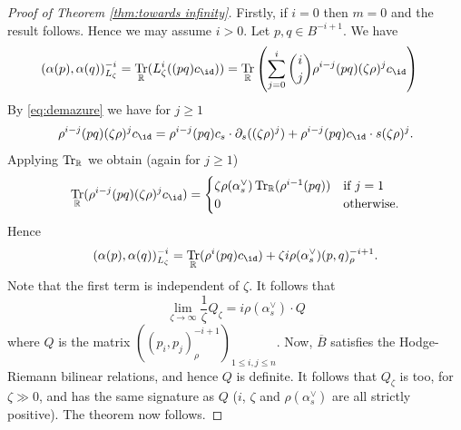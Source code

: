 \documentclass[11pt]{amsart}
\numberwithin{equation}{section}
\def\a{\alpha}
\def\z{\zeta}
\DeclareMathOperator{\Tr}{Tr}
\def\ov{\overline}
\def\to{\rightarrow}
\theoremstyle{definition}
\theoremstyle{remark}
\begin{document}
\begin{proof}[Proof of Theorem \ref{thm:towards infinity}]
Firstly, if $i = 0$ then $m = 0$ and the result follows. Hence we may
assume $i > 0$. Let $p, q \in B^{-i+1}$. We have
\begin{align*}
(\a(p),\a(q))^{-i}_{L_\z} &= \Tr_{\RM}(L_\z^i((pq)c_\id))=\Tr_{\RM} \left
  (\sum_{j=0}^i{i \choose j} \rho^{i-j} (pq) (\z\rho)^jc_\id \right)
\end{align*}
By \eqref{eq:demazure} we have for $j \ge 1$
\[
\rho^{i-j} (pq) (\z\rho)^jc_\id  = \rho^{i-j} (pq) c_s
\cdot \partial_s((\z\rho)^j) + \rho^{i-j} (pq) c_{\id} \cdot s(\zeta\rho)^j.
\]
Applying $\Tr_{\RM}$ we obtain (again for $j \ge 1$)
\[
\Tr_{\RM}(\rho^{i-j} (pq) (\z\rho)^jc_\id) = \begin{cases}
\z \rho(\alpha_s^\vee) \Tr_{\RM}(\rho^{i-1} (pq)) & \text{if $j = 1$} \\
0 & \text{otherwise.}
\end{cases}
\]
Hence
\[
(\a(p),\a(q))^{-i}_{L_\z} = \Tr_{\RM}(\rho^i(pq)c_\id) + \z i\rho(\alpha_s^\vee) (p,q)_\rho^{-i+1}.
\]
Note that the first term is independent of $\z$. It follows that
\[ \lim_{\z \to \infty} \frac{1}{\z} Q_\z = i \rho(\a_s^\vee) \cdot Q \]
where $Q$ is the matrix $( (p_i,p_j)_\rho^{-i+1} )_{1 \le i, j \le n}$.
Now, $\ov{B}$ satisfies the Hodge-Riemann bilinear relations, and hence $Q$ is definite. It follows that $Q_\z$ is too, for $\z \gg 0$, and has the same
signature as $Q$ ($i$, $\z$ and $\rho(\a_s^\vee)$ are all strictly positive). The theorem now follows. \end{proof}
\end{document}
